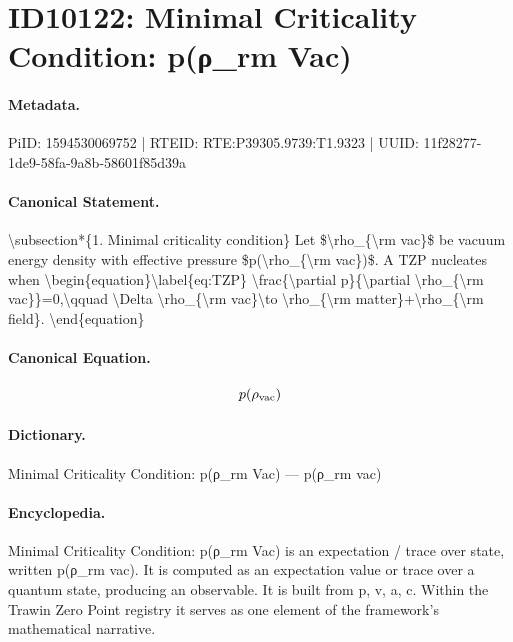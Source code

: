 \section*{ID10122: Minimal Criticality Condition: p(ρ\_rm Vac)}
\paragraph{Metadata.}
PiID: 1594530069752 | RTEID: RTE:P39305.9739:T1.9323 | UUID: 11f28277-1de9-58fa-9a8b-58601f85d39a

\paragraph{Canonical Statement.}
\textbackslash{}subsection*\{1. Minimal criticality condition\} Let \$\textbackslash{}rho\_\{\textbackslash{}rm vac\}\$ be vacuum energy density with effective pressure \$p(\textbackslash{}rho\_\{\textbackslash{}rm vac\})\$. A TZP nucleates when \textbackslash{}begin\{equation\}\textbackslash{}label\{eq:TZP\} \textbackslash{}frac\{\textbackslash{}partial p\}\{\textbackslash{}partial \textbackslash{}rho\_\{\textbackslash{}rm vac\}\}=0,\textbackslash{}qquad \textbackslash{}Delta \textbackslash{}rho\_\{\textbackslash{}rm vac\}\textbackslash{}to \textbackslash{}rho\_\{\textbackslash{}rm matter\}+\textbackslash{}rho\_\{\textbackslash{}rm field\}. \textbackslash{}end\{equation\}

\paragraph{Canonical Equation.}
\[
p(\rho_{\rm vac})
\]

\paragraph{Dictionary.}
Minimal Criticality Condition: p(ρ\_rm Vac) — p(ρ\_rm vac)

\paragraph{Encyclopedia.}
Minimal Criticality Condition: p(ρ\_rm Vac) is an expectation / trace over state, written p(ρ\_rm vac). It is computed as an expectation value or trace over a quantum state, producing an observable. It is built from p, v, a, c. Within the Trawin Zero Point registry it serves as one element of the framework's mathematical narrative.
